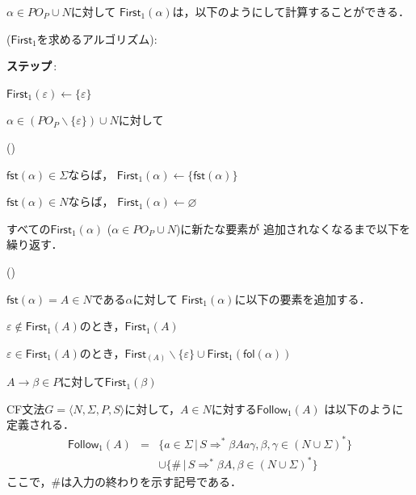 \documentclass[a4j,dvipdfmx]{jbook}
\begin{document}
$\alpha\in PO_P\cup N$に対して
$\mathsf{First}_1(\alpha)$は，以下のようにして計算することができる．

\begin{Alg}\mbox{\rm ($\mathsf{First}_1$を求めるアルゴリズム):}
  \begin{list}{{\bf ステップ}\,{\rm{}:}}{}
    \item $\mathsf{First}_1(\varepsilon)\leftarrow\{\varepsilon\}$
    \item $\alpha\in (PO_P\backslash\{\varepsilon\})\cup N$に対して
          \begin{list}{()}{}
            \item $\mathsf{fst}(\alpha)\in\Sigma$ならば，
                  $\mathsf{First}_1(\alpha)\leftarrow \{\mathsf{fst}(\alpha)\}$
            \item $\mathsf{fst}(\alpha)\in N$ならば，
                  $\mathsf{First}_1(\alpha)\leftarrow \varnothing$
          \end{list}
    \item すべての$\mathsf{First}_1(\alpha)$ ($\alpha\in PO_P\cup N$)に新たな要素が
          追加されなくなるまで以下を繰り返す．
          \begin{list}{()}{}
            \item $\mathsf{fst}(\alpha)=A\in N$である$\alpha$に対して
                  $\mathsf{First}_1(\alpha)$に以下の要素を追加する．
                  \begin{list}{}{}
                    \item $\varepsilon\notin\mathsf{First}_1(A)$のとき，$\mathsf{First}_1(A)$
                    \item $\varepsilon\in\mathsf{First}_1(A)$のとき，$\mathsf{First}_(A)\backslash\{\varepsilon\}\cup\mathsf{First}_1(\mathsf{fol}(\alpha))$
                  \end{list}
            \item $A\rightarrow\beta\in P$に対して$\mathsf{First}_1(\beta)$
          \end{list}
  \end{list}
\end{Alg}

\begin{Def}
  CF文法$G=\langle N,\Sigma,P,S\rangle$に対して，$A\in N$に対する$\mathsf{Follow}_1(A)$
  は以下のように定義される．
  \[\begin{array}{rcl}
      \mathsf{Follow}_1(A) & = & \{a\in\Sigma\,|\,S\Rightarrow^\ast\beta Aa\gamma,\beta,\gamma\in(N\cup\Sigma)^\ast\} \\
                           &   & \cup\{\#\,|\,S\Rightarrow^\ast\beta A, \beta\in(N\cup\Sigma)^\ast\}
    \end{array}
  \]
  ここで，$\#$は入力の終わりを示す記号である．
\end{Def}
\end{document}
